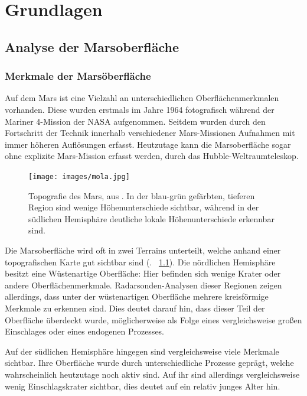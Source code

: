 \chapter{Grundlagen}
\label{chap:basics}

\section{Analyse der Marsoberfläche}
\label{sec:mars_analysis}

\subsection{Merkmale der Marsöberfläche}
\label{ssec:mars_surface}
Auf dem Mars ist eine Vielzahl an unterschiedlichen Oberflächenmerkmalen vorhanden. Diese wurden erstmals im Jahre 1964 fotografisch während der Mariner 4-Mission der NASA aufgenommen. \cite{mariner4} Seitdem wurden durch den Fortschritt der Technik innerhalb verschiedener Mars-Missionen Aufnahmen mit immer höheren Auflösungen erfasst. Heutzutage kann die Marsoberfläche sogar ohne explizite Mars-Mission erfasst werden, \zB durch das Hubble-Weltraumteleskop.

\begin{figure}[H]
	\centering
	\texttt{[image: images/mola.jpg]}
	\captionsetup{width=.8\textwidth}
	\caption{Topografie des Mars, aus \cite{mola}. In der blau-grün gefärbten, tieferen Region sind wenige Höhenunterschiede sichtbar, während in der südlichen Hemisphäre deutliche lokale Höhenunterschiede erkennbar sind.}
	\label{fig:mola}
\end{figure}

Die Marsoberfläche wird oft in zwei Terrains unterteilt, welche anhand einer topografischen Karte gut sichtbar sind (\vgl. \figurename~\ref{fig:mola}). Die nördlichen Hemisphäre besitzt eine Wüstenartige Oberfläche: Hier befinden sich wenige Krater oder andere Oberflächenmerkmale. Radarsonden-Analysen dieser Regionen zeigen allerdings, dass unter der wüstenartigen Oberfläche mehrere kreisförmige Merkmale zu erkennen sind. Dies deutet darauf hin, dass dieser Teil der Oberfläche überdeckt wurde, möglicherweise als Folge eines vergleichsweise großen Einschlages oder eines endogenen Prozesses. \cite[Kap.~7]{greeley_13}

Auf der südlichen Hemisphäre hingegen sind vergleichsweise viele Merkmale sichtbar. Ihre Oberfläche wurde durch unterschiedliche Prozesse geprägt, welche wahrscheinlich heutzutage noch aktiv sind. Auf ihr sind allerdings vergleichsweise wenig Einschlagskrater sichtbar, dies deutet auf ein relativ junges Alter hin. \cite[Kap.~7]{greeley_13}

